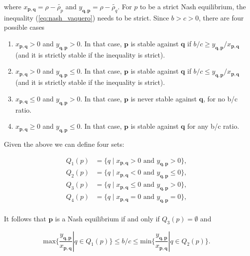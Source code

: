 \documentclass{article}
\theoremstyle{definition}
\begin{document}
where \(x_{\mathbf{p}, \mathbf{q}} = \rho - \tilde{\rho_p}\) and  \(y_{\mathbf{q}, \mathbf{p}} = \rho - \tilde{\rho_q}\).
For \(p\) to be a strict Nash equilibrium, the inequality (\ref{eq:nash_vaquero}) needs
to be strict. Since \(b > c > 0\), there are four possible cases

\begin{enumerate}
  \item \(x_{\mathbf{p}, \mathbf{q}} > 0 \) and \(y_{\mathbf{q}, \mathbf{p}} > 0\). In that case, \(\mathbf{p}\) is stable
  against \(\mathbf{q}\) if \(b/c \geq y_{\mathbf{q}, \mathbf{p}}/x_{\mathbf{p}, \mathbf{q}}\) (and it is strictly stable if the inequality is
  strict).
  \item \(x_{\mathbf{p}, \mathbf{q}} > 0 \) and \(y_{\mathbf{q}, \mathbf{p}} \leq 0\). In that case, \(\mathbf{p}\) is stable
  against \(\mathbf{q}\) if \(b/c \leq y_{\mathbf{q}, \mathbf{p}}/x_{\mathbf{p}, \mathbf{q}}\) (and it is strictly stable if the inequality is
  strict).
  \item \(x_{\mathbf{p}, \mathbf{q}} \leq 0 \) and \(y_{\mathbf{q}, \mathbf{p}} > 0\). In that case,
  \(\mathbf{p}\) is never stable against \(\mathbf{q}\), for no b/c ratio.
  \item  \(x_{\mathbf{p}, \mathbf{q}} \geq 0 \) and \(y_{\mathbf{q}, \mathbf{p}} \leq 0\). In that case, \(\mathbf{p}\) is stable against \(\mathbf{q}\) for any b/c ratio.
\end{enumerate}

Given the above we can define four sets:

\begin{align}
  Q_1(p) & = \{q \; | \; x_{\mathbf{p}, \mathbf{q}} > 0 \text{ and } y_{\mathbf{q}, \mathbf{p}} > 0 \}, \\
  Q_2(p) & = \{q \; | \; x_{\mathbf{p}, \mathbf{q}} < 0 \text{ and } y_{\mathbf{q}, \mathbf{p}} \leq 0 \}, \\
  Q_3(p) & = \{q \; | \; x_{\mathbf{p}, \mathbf{q}} \leq 0 \text{ and } y_{\mathbf{q}, \mathbf{p}} > 0\}, \\
  Q_4(p) & = \{q \; | \; x_{\mathbf{p}, \mathbf{q}} = 0  \text{ and } y_{\mathbf{q}, \mathbf{p}} = 0 \}, \\
\end{align}

It follows that \(\mathbf{p}\) is a Nash equilibrium if and only if \(Q_3(p) = \emptyset\)
and

\begin{equation}\label{eq:nash_vaquero_inequalities}
  \text{max}\{ \frac{y_{\mathbf{q}, \mathbf{p}}}{x_{\mathbf{p}, \mathbf{q}}} | q \in Q_1(p) \} \leq b / c  \leq \text{min}\{\frac{y_{\mathbf{q}, \mathbf{p}}}{x_{\mathbf{p}, \mathbf{q}}} | q \in Q_2(p) \}.
\end{equation}
\end{document}
